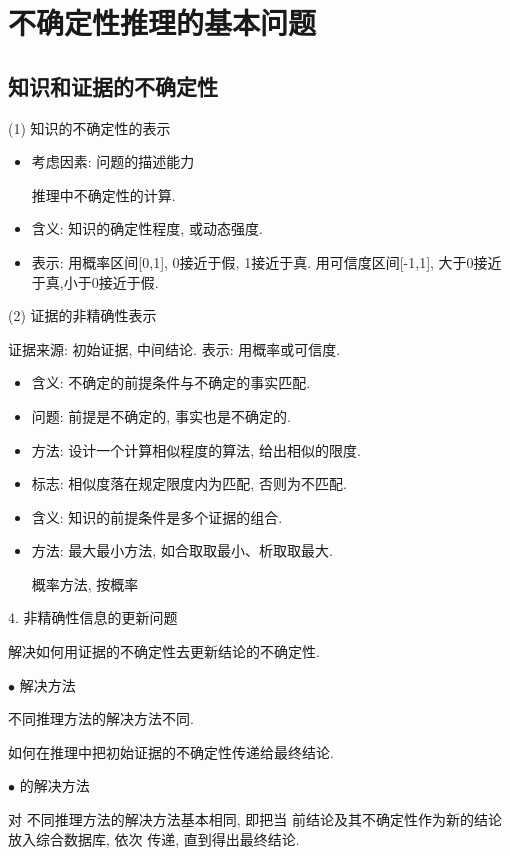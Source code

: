 \section{不确定性推理的基本问题 }\label{AI32C6Sec6.2}
\subsection{知识和证据的不确定性}

(1) 知识的不确定性的表示
\begin{itemize}
\item 考虑因素: 问题的描述能力

      推理中不确定性的计算.

\item 含义: 知识的确定性程度, 或动态强度.
\item 表示: 用概率区间[0,1], 0接近于假, 1接近于真. 用可信度区间[-1,1], 大于0接近于真,小于0接近于假.
\end{itemize}

(2) 证据的非精确性表示

    证据来源: 初始证据, 中间结论.
    表示: 用概率或可信度.
\begin{itemize}
\item 含义: 不确定的前提条件与不确定的事实匹配.
\item 问题: 前提是不确定的, 事实也是不确定的.
\item 方法: 设计一个计算相似程度的算法, 给出相似的限度.
\item 标志: 相似度落在规定限度内为匹配, 否则为不匹配.
\item 含义: 知识的前提条件是多个证据的组合.
\item 方法: 最大最小方法, 如合取取最小、析取取最大.

    概率方法, 按概率
\end{itemize}

4. 非精确性信息的更新问题

   \qquad {} 解决如何用证据的不确定性去更新结论的不确定性.

    $\bullet$ 解决方法

   \qquad  {} 不同推理方法的解决方法不同.

   \qquad  {} 如何在推理中把初始证据的不确定性传递给最终结论.

    $\bullet$ 的解决方法

   \qquad  对 不同推理方法的解决方法基本相同, 即把当 前结论及其不确定性作为新的结论放入综合数据库, 依次 传递, 直到得出最终结论.

